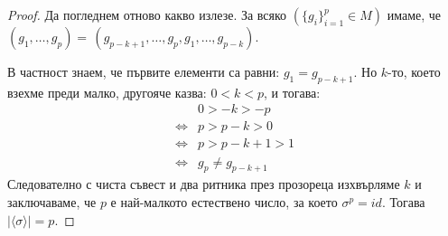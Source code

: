 \documentclass{article}
\newcommand{\grsigma}[0]{{\langle \sigma \rangle}}
\begin{document}
\begin{proof}
    Да погледнем отново какво излезе.
    За всяко $(\{g_i\}_{i=1}^p \in M)$ имаме, че $(g_1,\dots, g_p) =\,(g_{p-k+1}, \dots, g_p, g_1,\dots, g_{p-k})$.

    В частност знаем, че първите елементи са равни: $g_1 = g_{p-k+1}$.
    Но $k$-то, което взехме преди малко, другояче казва: $0 < k < p$, и тогава:
    \begin{align*}
        &0 > -k > -p \\
        \Longleftrightarrow &p > p-k > 0 \\
        \Longleftrightarrow &p > p-k+1 > 1\\
        \Longleftrightarrow &g_p \not= g_{p-k+1}
    \end{align*}
    Следователно с чиста съвест и два ритника през прозореца изхвърляме $k$ и заключаваме, че $p$ е най-малкото естествено число, за което $\sigma^p = id$. Тогава $|\grsigma| = p$.
\end{proof}

\newcommand{\eqdefof}[1]{\underset{\textit{на } #1}{\overset{\textit{деф.}}{=\joinrel=}}}
\newcommand{\eqdefcd}[0]{\eqdefof \centerdot}
\end{document}
